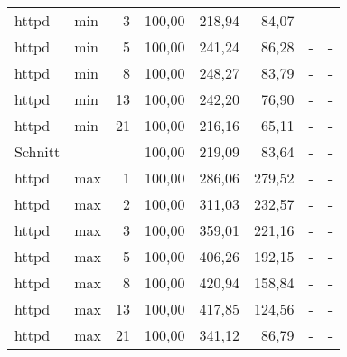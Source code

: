 \begin{footnotesize}
\begin{longtable}{llrrrrrr}
		httpd          & min     & 3          & 100,00 & 218,94                      & 84,07                       & -                           & -                           \\
		httpd          & min     & 5          & 100,00 & 241,24                      & 86,28                       & -                           & -                           \\
		httpd          & min     & 8          & 100,00 & 248,27                      & 83,79                       & -                           & -                           \\
		httpd          & min     & 13         & 100,00 & 242,20                      & 76,90                       & -                           & -                           \\
		httpd          & min     & 21         & 100,00 & 216,16                      & 65,11                       & -                           & -                           \\ \hline
		Schnitt        &         &            & 100,00 & 219,09                      & 83,64                       & -                           & -                           \\ \hline
		httpd          & max     & 1          & 100,00 & 286,06                      & 279,52                      & -                           & -                           \\
		httpd          & max     & 2          & 100,00 & 311,03                      & 232,57                      & -                           & -                           \\
		httpd          & max     & 3          & 100,00 & 359,01                      & 221,16                      & -                           & -                           \\
		httpd          & max     & 5          & 100,00 & 406,26                      & 192,15                      & -                           & -                           \\
		httpd          & max     & 8          & 100,00 & 420,94                      & 158,84                      & -                           & -                           \\
		httpd          & max     & 13         & 100,00 & 417,85                      & 124,56                      & -                           & -                           \\
		httpd          & max     & 21         & 100,00 & 341,12                      & 86,79                       & -                           & -                           \\ \hline

\end{longtable}
\end{footnotesize}
